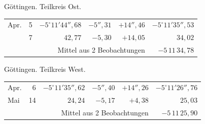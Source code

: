 \noindent\begin{minipage}[t]{.495\textwidth}\centering Göttingen. Teilkreis Ost.\par\smallskip
{\scriptsize\setlength{\tabcolsep}{1pt}\renewcommand{\arraystretch}{1.2}\begin{tabular}{lr|r|r|r|r|}
Apr.&5&$-5^\circ11'44''{,}68$&$-5''{,}31$&$+14''{,}46$&$-5^\circ11'35''{,}53$\\
&7&$42{,}77$&$-5{,}30$&$+14{,}05$&$34{,}02$\\
\cline{6-6}\multicolumn{5}{r}{Mittel aus 2 Beobachtungen}&$-5\,11\,34{,}78$
\end{tabular}}\end{minipage}\hfill\begin{minipage}[t]{.495\textwidth}\centering Göttingen. Teilkreis West.\par\smallskip
{\scriptsize\setlength{\tabcolsep}{1pt}\renewcommand{\arraystretch}{1.2}\begin{tabular}{lr|r|r|r|r}
Apr.&6&$-5^\circ11'35''{,}62$&$-5''{,}40$&$+14''{,}26$&$-5^\circ11'26''{,}76$\\
Mai&14&$24{,}24$&$-5{,}17$&$+4{,}38$&$25{,}03$\\
\cline{6-6}\multicolumn{5}{r}{Mittel aus 2 Beobachtungen}&$-5\,11\,25{,}90$
\end{tabular}}\end{minipage}
\par\vspace{4mm}

